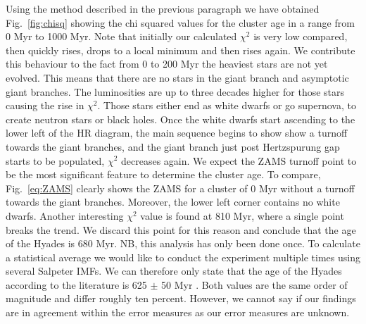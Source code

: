 \documentclass{aa}
\begin{document}
Using the method described in the previous paragraph we have obtained Fig.~\ref{fig:chisq} showing the chi squared values for the cluster age in a range from 0 Myr to 1000 Myr. Note that initially our calculated $\chi^2$ is very low compared, then quickly rises, drops to a local minimum and then rises again. We contribute this behaviour to the fact from 0 to 200 Myr the heaviest stars are not yet evolved. This means that there are no stars in the giant branch and asymptotic giant branches. The luminosities are up to three decades higher for those stars causing the rise in $\chi^2$. Those stars either end as white dwarfs or go supernova, to create neutron stars or black holes. Once the white dwarfs start ascending to the lower left of the HR diagram, the main sequence begins to show show a turnoff towards the giant branches, and the giant branch just post Hertzspurung gap starts to be populated, $\chi^2$ decreases again. We expect the ZAMS turnoff point to be the most significant feature to determine the cluster age. To compare, Fig.~\ref{eq:ZAMS} clearly shows the ZAMS for a cluster of 0 Myr without a turnoff towards the giant branches. Moreover, the lower left corner contains no white dwarfs. Another interesting $\chi^2$ value is found at 810 Myr, where a single point breaks the trend. We discard this point for this reason and conclude that the age of the Hyades is 680 Myr. NB, this analysis has only been done once. To calculate a statistical average we would like to conduct the experiment multiple times using several Salpeter IMFs. We can therefore only state that the age of the Hyades according to the literature is 625 $\pm$ 50 Myr \citep{1998A&A...331...81P}. Both values are the same order of magnitude and differ roughly ten percent. However, we cannot say if our findings are in agreement within the error measures as our error measures are unknown.
\end{document}
